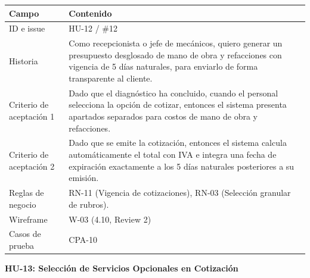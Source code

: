 {\def\LTcaptype{none} %
\begin{longtable}[]{@{}
  >{\raggedright\arraybackslash}p{}
  >{\raggedright\arraybackslash}p{}@{}}
\toprule\noalign{}
\begin{minipage}[b]{\linewidth}\raggedright
\textbf{Campo}
\end{minipage} & \begin{minipage}[b]{\linewidth}\raggedright
\textbf{Contenido}
\end{minipage} \\
\midrule\noalign{}
\endhead
\bottomrule\noalign{}
\endlastfoot
ID e issue & HU-12 / \#12 \\
Historia & Como recepcionista o jefe de mecánicos, quiero generar un
presupuesto desglosado de mano de obra y refacciones con vigencia de 5
días naturales, para enviarlo de forma transparente al cliente. \\
Criterio de aceptación 1 & Dado que el diagnóstico ha concluido, cuando
el personal selecciona la opción de cotizar, entonces el sistema
presenta apartados separados para costos de mano de obra y
refacciones. \\
Criterio de aceptación 2 & Dado que se emite la cotización, entonces el
sistema calcula automáticamente el total con IVA e integra una fecha de
expiración exactamente a los 5 días naturales posteriores a su
emisión. \\
Reglas de negocio & RN-11 (Vigencia de cotizaciones), RN-03 (Selección
granular de rubros). \\
Wireframe & W-03 (4.10, Review 2) \\
Casos de prueba & CPA-10 \\
\end{longtable}
}

\textbf{HU-13: Selección de Servicios Opcionales en Cotización}

